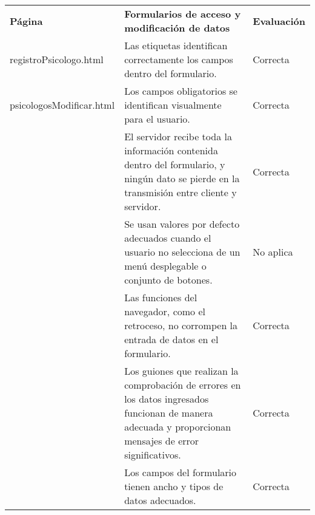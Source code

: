 \begin{table}[htpb]
\centering
\begin{tabularx}{\textwidth}{|l|X|l|}
\hline
\rowcolor[gray]{0.9}\multicolumn{3}{|l|}{\textbf{Anexo PI-006}}                                                                                                                                                                                                            \\ \hline
\textbf{Página}                                                     & \textbf{Formularios de acceso y modificación de datos}                                                                                                    & \textbf{Evaluación} \\ \hline
registroPsicologo.html & Las etiquetas identifican correctamente los campos dentro del formulario.                                                                                 & Correcta            \\ \cline{2-3} 
psicologosModificar.html                                                                    & Los campos obligatorios se identifican visualmente para el usuario.                                                                                       & Correcta            \\ \cline{2-3} 
                                                                    & El servidor recibe toda la información contenida dentro del formulario, y ningún dato se pierde en la transmisión entre cliente y servidor.               & Correcta            \\ \cline{2-3} 
                                                                    & Se usan valores por defecto adecuados cuando el usuario no selecciona de un menú desplegable o conjunto de botones.                                       & No aplica           \\ \cline{2-3} 
                                                                    & Las funciones del navegador, como el retroceso, no corrompen la entrada de datos en el formulario.                                                        & Correcta            \\ \cline{2-3} 
                                                                    & Los guiones que realizan la comprobación de errores en los datos ingresados funcionan de manera adecuada y proporcionan mensajes de error significativos. & Correcta            \\ \cline{2-3} 
                                                                    & Los campos del formulario tienen ancho y tipos de datos adecuados.                                                                                        & Correcta            \\ \cline{2-3} 

\end{tabularx}
\end{table}

